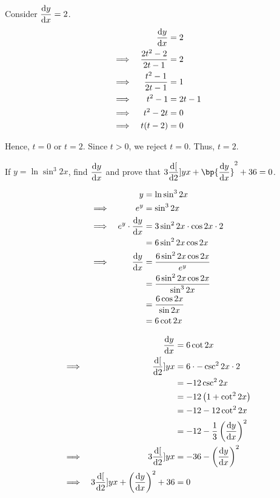\documentclass{echw}
\begin{document}
        Consider $\dfrac{\mathrm{d} y}{\mathrm{d} x} = 2$.
        \begin{alignat*}{2}
            &&\dfrac{\mathrm{d} y}{\mathrm{d} x} &= 2\\
            \implies&&\dfrac{2t^2 - 2}{2t - 1} &= 2\\
            \implies&&\dfrac{t^2 - 1}{2t - 1} &= 1\\
            \implies&&t^2 - 1 &= 2t -1\\
            \implies&&t^2 - 2t &= 0\\
            \implies&&t(t-2) &= 0
        \end{alignat*}

        Hence, $t = 0$ or $t = 2$. Since $t > 0$, we reject $t = 0$. Thus, $t = 2$.


    \problem{}
        If $y = \ln{\sin^3 2x}$, find $\dfrac{\mathrm{d} y}{\mathrm{d} x}$ and prove that $3\der[2]{y}{x} + \bp{\der{y}{x}}^2 + 36 = 0$.

    \solution
        \begin{alignat*}{2}
            &&y &= \ln{\sin^3 2x}\\
            \implies&&e^y &= \sin^3 2x\\
            \implies&&e^y \cdot \dfrac{\mathrm{d} y}{\mathrm{d} x} &= 3\sin^2 2x \cdot \cos 2x \cdot 2\\
            && &= 6\sin^2 2x \cos 2x\\
            \implies&& \dfrac{\mathrm{d} y}{\mathrm{d} x} &= \dfrac{6\sin^2 2x \cos 2x}{e^y}\\
            && &= \dfrac{6\sin^2 2x \cos 2x}{\sin^3 2x}\\
            && &= \dfrac{6 \cos 2x}{\sin 2x}\\
            && &= 6 \cot 2x
        \end{alignat*}
        

        \begin{alignat*}{2}
            &&\dfrac{\mathrm{d} y}{\mathrm{d} x} &= 6\cot 2x\\
            \implies&&\dfrac{\mathrm{d} [}{\mathrm{d} 2}]{y}{x} &= 6 \cdot -\csc^2 2x \cdot 2\\
            && &= -12 \csc^2 2x\\
            && &= -12 \left(1 + \cot^2 2x\right)\\
            && &= -12 - 12\cot^2 2x\\
            && &= -12 - \dfrac13 \left(\dfrac{\mathrm{d} y}{\mathrm{d} x}\right)^2\\
            \implies&&3\dfrac{\mathrm{d} [}{\mathrm{d} 2}]{y}{x} &= -36 - \left(\dfrac{\mathrm{d} y}{\mathrm{d} x}\right)^2\\
            \implies&& 3\dfrac{\mathrm{d} [}{\mathrm{d} 2}]{y}{x} + \left(\dfrac{\mathrm{d} y}{\mathrm{d} x}\right)^2 + 36 &= 0
        \end{alignat*}
\end{document}
